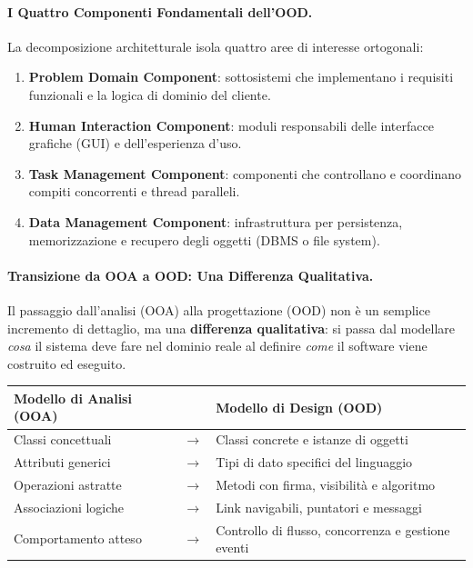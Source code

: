 \documentclass[12pt]{extarticle}
\begin{document}
\paragraph{I Quattro Componenti Fondamentali dell'OOD.}
La decomposizione architetturale isola quattro aree di interesse ortogonali:
\begin{enumerate}
    \item \textbf{Problem Domain Component}: sottosistemi che implementano i requisiti funzionali e la logica di dominio del cliente.
    \item \textbf{Human Interaction Component}: moduli responsabili delle interfacce grafiche (GUI) e dell'esperienza d'uso.
    \item \textbf{Task Management Component}: componenti che controllano e coordinano compiti concorrenti e thread paralleli.
    \item \textbf{Data Management Component}: infrastruttura per persistenza, memorizzazione e recupero degli oggetti (DBMS o file system).
\end{enumerate}

\paragraph{Transizione da OOA a OOD: Una Differenza Qualitativa.}
Il passaggio dall'analisi (OOA) alla progettazione (OOD) non è un semplice incremento di dettaglio, ma una \textbf{differenza qualitativa}: si passa dal modellare \textit{cosa} il sistema deve fare nel dominio reale al definire \textit{come} il software viene costruito ed eseguito.

\begin{center}
\small
\begin{tabular}{p{5.2cm}c p{7.2cm}}
\toprule
\textbf{Modello di Analisi (OOA)} & & \textbf{Modello di Design (OOD)} \\
\midrule
Classi concettuali & $\longrightarrow$ & Classi concrete e istanze di oggetti \\
Attributi generici & $\longrightarrow$ & Tipi di dato specifici del linguaggio \\
Operazioni astratte & $\longrightarrow$ & Metodi con firma, visibilità e algoritmo \\
Associazioni logiche & $\longrightarrow$ & Link navigabili, puntatori e messaggi \\
Comportamento atteso & $\longrightarrow$ & Controllo di flusso, concorrenza e gestione eventi \\
\bottomrule
\end{tabular}
\end{center}
\end{document}

